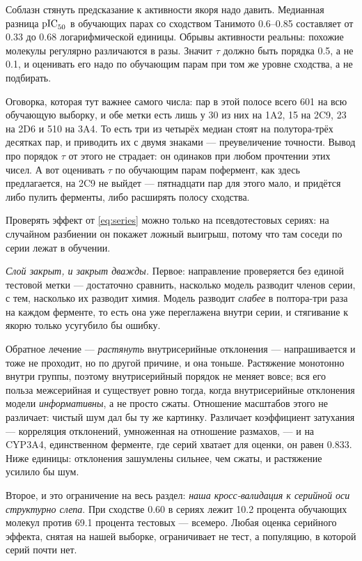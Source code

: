 Соблазн стянуть предсказание к активности якоря надо давить. Медианная разница $\mathrm{pIC}_{50}$ в обучающих парах
со сходством Танимото 0.6--0.85 составляет от 0.33 до 0.68 логарифмической единицы. Обрывы активности
реальны: похожие молекулы регулярно различаются в разы. Значит $\tau$ должно быть порядка 0.5, а не 0.1,
и оценивать его надо по обучающим парам при том же уровне сходства, а не подбирать.

Оговорка, которая тут важнее самого числа: пар в этой полосе всего 601 на всю обучающую выборку, и обе
метки есть лишь у 30 из них на 1A2, 15 на 2C9, 23 на 2D6 и 510 на 3A4. То есть три из четырёх медиан
стоят на полутора-трёх десятках пар, и приводить их с двумя знаками --- преувеличение точности. Вывод
про порядок $\tau$ от этого не страдает: он одинаков при любом прочтении этих чисел. А вот оценивать
$\tau$ по обучающим парам пофермент, как здесь предлагается, на 2C9 не выйдет --- пятнадцати пар для
этого мало, и придётся либо пулить ферменты, либо расширять полосу сходства.

Проверять эффект от \eqref{eq:series} можно только на псевдотестовых сериях: на случайном разбиении
он покажет ложный выигрыш, потому что там соседи по серии лежат в обучении.

\emph{Слой закрыт, и закрыт дважды.} Первое: направление проверяется без единой тестовой метки ---
достаточно сравнить, насколько модель разводит членов серии, с тем, насколько их разводит химия.
Модель разводит \emph{слабее} в полтора-три раза на каждом ферменте, то есть она уже переглажена
внутри серии, и стягивание к якорю только усугубило бы ошибку.

Обратное лечение --- \emph{растянуть} внутрисерийные отклонения --- напрашивается и тоже не проходит,
но по другой причине, и она тоньше. Растяжение монотонно внутри группы, поэтому внутрисерийный порядок
не меняет вовсе; вся его польза межсерийная и существует ровно тогда, когда внутрисерийные отклонения
модели \emph{информативны}, а не просто сжаты. Отношение масштабов этого не различает: чистый шум дал
бы ту же картинку. Различает коэффициент затухания --- корреляция отклонений, умноженная на отношение
размахов, --- и на CYP3A4, единственном ферменте, где серий хватает для оценки, он равен 0.833. Ниже
единицы: отклонения зашумлены сильнее, чем сжаты, и растяжение усилило бы шум.

Второе, и это ограничение на весь раздел: \emph{наша кросс-валидация к серийной оси структурно слепа}.
При сходстве 0.60 в сериях лежит 10.2 процента обучающих молекул против 69.1 процента тестовых ---
всемеро. Любая оценка серийного эффекта, снятая на нашей выборке, ограничивает не тест, а популяцию, в
которой серий почти нет.

